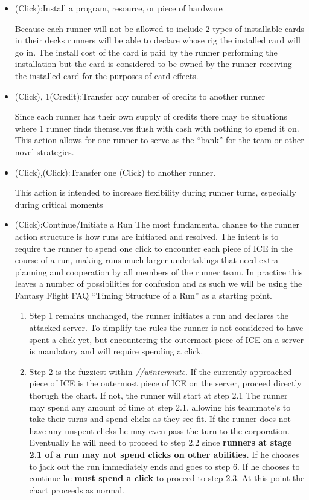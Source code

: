 \documentclass[titlepage]{article}
\begin{document}
			\begin{itemize}
				\item (Click):Install a program, resource, or piece of hardware

					Because each runner will not be allowed to include 2 types of installable cards in their decks runners will be able to declare whose rig the installed card will go in. The install cost of the card is paid by the runner performing the installation but the card is considered to be owned by the runner receiving the installed card for the purposes of card effects.

				\item (Click), 1(Credit):Transfer any number of credits to another runner

					Since each runner has their own supply of credits there may be situations where 1 runner finds themselves flush with cash with nothing to spend it on. This action allows for one runner to serve as the ``bank'' for the team or other novel strategies.

				\item (Click),(Click):Transfer one (Click) to another runner.

					This action is intended to increase flexibility during runner turns, especially during critical moments

				\item (Click):Continue/Initiate a Run
					The most fundamental change to the runner action structure is how runs are initiated and resolved. The intent is to require the runner to spend one click to encounter each piece of ICE in the course of a run, making runs much larger undertakings that need extra planning and cooperation by all members of the runner team. In practice this leaves a number of possibilities for confusion and as such we will be using the Fantasy Flight FAQ ``Timing Structure of a Run'' as a starting point.
					\begin{enumerate}
						\item Step 1 remains unchanged, the runner initiates a run and declares the attacked server. To simplify the rules the runner is not considered to have spent a click yet, but encountering the outermost piece of ICE on a server is mandatory and will require spending a click.
						\item Step 2 is the fuzziest within \emph{//wintermute}. If the currently approached piece of ICE is the outermost piece of ICE on the server, proceed directly thorugh the chart. If not, the runner will start at step 2.1 The runner may spend any amount of time at step 2.1, allowing his teammate's to take their turns and spend clicks as they see fit. If the runner does not have any unspent clicks he may even pass the turn to the corporation. Eventually he will need to proceed to step 2.2 since \textbf{runners at stage 2.1 of a run may not spend clicks on other abilities.} If he chooses to jack out the run immediately ends and goes to step 6. If he chooses to continue he \textbf{must spend a click} to proceed to step 2.3. At this point the chart proceeds as normal.
					\end{enumerate}

			\end{itemize}
\end{document}
